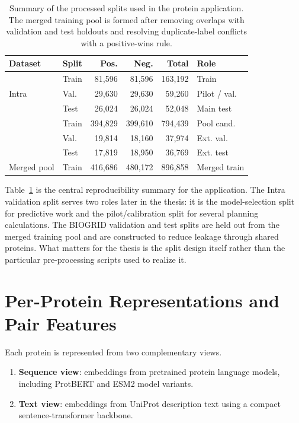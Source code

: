 \begin{table}[ht]
\centering
\small
\renewcommand{\arraystretch}{1.12}
\setlength{\tabcolsep}{5pt}
\begin{tabular}{@{}llrrrl@{}}
\toprule
Dataset & Split & Pos. & Neg. & Total & Role \\
\midrule
\multirow{3}{*}{Intra}
  & Train & 81{,}596 & 81{,}596 & 163{,}192 & Train \\
  & Val.  & 29{,}630 & 29{,}630 & 59{,}260 & Pilot / val. \\
  & Test  & 26{,}024 & 26{,}024 & 52{,}048 & Main test \\
\addlinespace[2pt]
\multirow{3}{*}{BIOGRID}
  & Train & 394{,}829 & 399{,}610 & 794{,}439 & Pool cand. \\
  & Val.  & 19{,}814 & 18{,}160 & 37{,}974 & Ext. val. \\
  & Test  & 17{,}819 & 18{,}950 & 36{,}769 & Ext. test \\
\addlinespace[2pt]
Merged pool & Train & 416{,}686 & 480{,}172 & 896{,}858 & Merged train \\
\bottomrule
\end{tabular}
\caption[Processed data splits for the protein application]{Summary of the processed splits used in the protein application. The merged training pool is formed after removing overlaps with validation and test holdouts and resolving duplicate-label conflicts with a positive-wins rule.}
\label{tab:chap4_data_splits}
\end{table}

Table~\ref{tab:chap4_data_splits} is the central reproducibility summary for the application. The Intra validation split serves two roles later in the thesis: it is the model-selection split for predictive work and the pilot/calibration split for several planning calculations. The BIOGRID validation and test splits are held out from the merged training pool and are constructed to reduce leakage through shared proteins. What matters for the thesis is the split design itself rather than the particular pre-processing scripts used to realize it.

\section[Representations and Pair Features]{Per-Protein Representations and Pair Features}

Each protein is represented from two complementary views.
\begin{enumerate}
    \item \textbf{Sequence view}: embeddings from pretrained protein language models, including ProtBERT and ESM2 model variants.
    \item \textbf{Text view}: embeddings from UniProt description text using a compact sentence-transformer backbone.
\end{enumerate}


